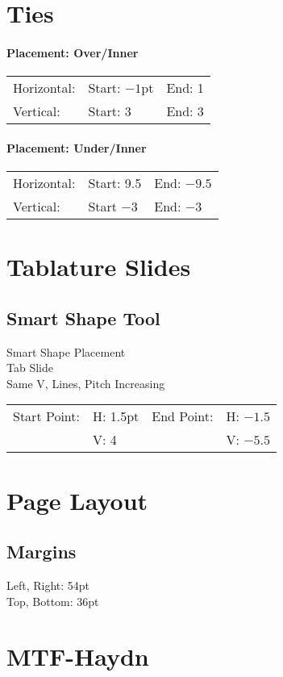 \documentclass[]{memoir}
\begin{document}
\section{Ties}
\paragraph{Placement: Over/Inner}
\begin{tabular}{l l l}
Horizontal: & Start: $-1$pt & End: 1\\
Vertical: & Start: 3 & End: 3\\
\end{tabular}
\paragraph{Placement: Under/Inner}
\begin{tabular}{l l l}
Horizontal: & Start: 9.5 & End: $-9.5$\\
Vertical: & Start $-3$ & End: $-3$
\end{tabular}
\section{Tablature Slides}
\subsection{Smart Shape Tool}
Smart Shape Placement\\
Tab Slide\\
Same V, Lines, Pitch Increasing\\
\begin{tabular}{l l l l}
Start Point: & H: 1.5pt & End Point: & H: $-1.5$\\
& V: 4 & & V: $-5.5$\\
\end{tabular}
\section{Page Layout}
\subsection{Margins}
Left, Right: 54pt\\
Top, Bottom: 36pt

\section{MTF-Haydn}
\label{sec:mtf-haydn}
\end{document}
